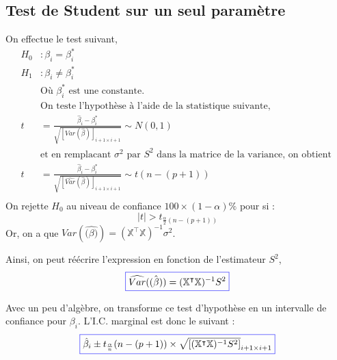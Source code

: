 \documentclass[11pt,french]{report}
\begin{document}
\subsection{Test de Student sur un seul paramètre}
On effectue le test suivant, 
\begin{align*}
H_0 &: \beta_i = \beta_i^* \\
H_1 &: \beta_i \neq \beta_i^* \\
&\text{Où $\beta_i^*$ est une constante.} \\
&\text{On teste l'hypothèse à l'aide de la statistique suivante, } \\
t &= \frac{\hat{\beta}_i - \beta_i^* }{\sqrt{[{Var}(\hat{\beta})]_{i+1 \times i+1}}} \sim N(0, 1) \\
&\text{et en remplacant $\sigma^2$ par $S^2$ dans la matrice de la variance, on obtient }\\
t &= \frac{\hat{\beta}_i - \beta_i^* }{\sqrt{[\widehat{Var}(\hat{\beta})]_{i+1 \times i+1}}} \sim t(n-(p+1)) \\
\end{align*}
On rejette $H_0$ au niveau de confiance $100 \times (1 - \alpha)\%$ pour si :
$$
|t| > t_{\frac{\alpha}{2}(n-(p+1))}
$$
Or, on a que $Var(\hat{\mathbb(\beta)}) = (\mathbb{X}^\intercal\mathbb{X})^{-1}\sigma^2$. \newline

Ainsi, on peut réécrire l'expression en fonction de l'estimateur $S^2$, 
\begin{equation}
\label{eq:varmulti}
\color{blue}
\boxed{\color{black}
\widehat{Var}(\hat{\mathbb(\beta)}) = (\mathbb{X}^\intercal\mathbb{X})^{-1}S^2}
\end{equation}

Avec un peu d'algèbre, on transforme ce test d'hypothèse en un intervalle de confiance pour $\beta_i$. L'I.C. marginal est donc le suivant :
\begin{equation}
\label{eq:ICmulti}
\color{blue}
\boxed{\color{black}
\hat{\beta}_i \pm t_{\frac{\alpha}{n}}(n - (p+1)) \times \sqrt{[(\mathbb{X}^\intercal\mathbb{X})^{-1}S^2]}_{i+1 \times i+1} }
\end{equation}
\end{document}
